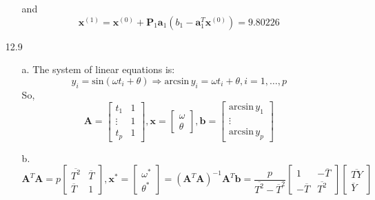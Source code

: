 \documentclass{article}
\begin{document}
\begin{itemize}
\begin{enumerate}
\begin{displaymath}
				\end{displaymath}
				and
				\begin{displaymath}
					\boldsymbol{x}^{(1)} = \boldsymbol{x}^{(0)} + \boldsymbol{P}_1 \boldsymbol{a}_1 (b_1 - \boldsymbol{a}_1^T \boldsymbol{x}^{(0)}) = 9.80226
				\end{displaymath}
		\end{enumerate}
	\item[12.9]
		\begin{enumerate}
			\item[a.]
				The system of linear equations is:
				\begin{displaymath}
					y_i = \mathrm{sin}(\omega t_i + \theta) \Rightarrow \mathrm{arcsin} \, y_i = \omega t_i + \theta, i = 1, \dots, p
				\end{displaymath}
				So,
				\begin{displaymath}
					\boldsymbol{A} = \left[ \begin{array}{cc} t_1 & 1 \\ \vdots & 1 \\ t_p & 1 \end{array} \right],
					\boldsymbol{x} = \left[ \begin{array}{c} \omega \\ \theta \end{array} \right],
					\boldsymbol{b} = \left[ \begin{array}{c} \mathrm{arcsin} \, y_1 \\ \vdots \\ \mathrm{arcsin} \, y_p \end{array} \right]
				\end{displaymath}
			\item[b.]
				\begin{displaymath}
					\boldsymbol{A}^T \boldsymbol{A} = p \left[ \begin{array}{cc} \overline{T^2} & \overline{T} \\ \overline{T} & 1 \end{array} \right], \boldsymbol{x}^* = \left[ \begin{array}{c} \omega^* \\ \theta^* \end{array} \right] = (\boldsymbol{A}^T \boldsymbol{A})^{-1} \boldsymbol{A}^T \boldsymbol{b} = \frac{p}{\overline{T^2} - \overline{T}^2} \left[ \begin{array}{cc} 1 & -\overline{T} \\ -\overline{T} & \overline{T^2} \end{array} \right] \left[ \begin{array}{c} \overline{TY} \\ \overline{Y} \end{array} \right]

\end{displaymath}
\end{enumerate}
\end{itemize}
\end{document}
